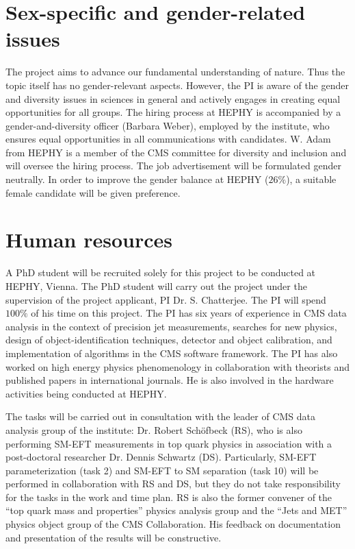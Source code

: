 \documentclass[a4paper,11pt]{article}
\begin{document}
\section{Sex-specific and gender-related issues}\label{sec:sex}
The project aims to advance our fundamental understanding of nature. 
Thus the topic itself has no gender-relevant aspects. 
However, the PI is aware of the gender and diversity issues in sciences in general and actively engages in creating equal opportunities for all groups. 
The hiring process at HEPHY is accompanied by a gender-and-diversity officer (Barbara Weber), employed by the institute, who ensures equal opportunities in all communications with candidates. 
W. Adam from HEPHY is a member of the CMS committee for diversity and inclusion and will oversee the hiring process. 
The job advertisement will be formulated gender neutrally. 
In order to improve the gender balance at HEPHY
($26\%$), a suitable female candidate will be given preference.

\section{Human resources}

A PhD student will be recruited solely for this project to be conducted at HEPHY, Vienna. 
The PhD student will carry out the project under the supervision of the project applicant, PI Dr. S. Chatterjee. 
The PI will spend $100\%$ of his time on this project. 
The PI has six years of experience in CMS data analysis in the context of precision jet measurements, searches for new physics, design of object-identification techniques, detector and object calibration, and implementation of algorithms in the CMS software framework. 
The PI has also worked on high energy physics phenomenology in collaboration with theorists and published papers in international journals. 
He is also involved in the hardware activities being conducted at HEPHY.%

The tasks will be carried out in consultation with the leader of CMS data analysis group of the institute: Dr. Robert Sch{\"o}fbeck (RS), who is also performing SM-EFT measurements in top quark physics in association with a post-doctoral researcher Dr. Dennis Schwartz (DS). 
Particularly, SM-EFT parameterization (task 2) and SM-EFT to SM separation (task 10) will be performed in collaboration with RS and DS, but they do not take responsibility for the tasks in the work and time plan.
RS is also the former convener of the ``top quark mass and properties'' physics analysis group and the ``Jets and MET'' physics object group of the CMS Collaboration. 
His feedback on documentation and presentation of the results will be constructive. 
\end{document}
